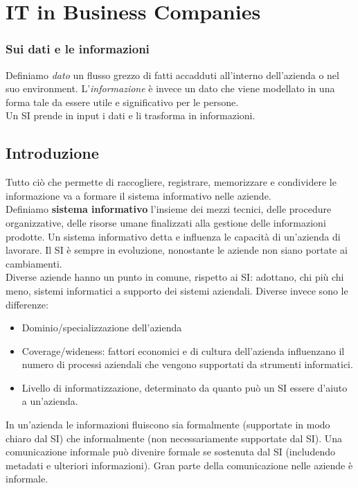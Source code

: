 \chapter{IT in Business Companies}
\subsection{Sui dati e le informazioni}
Definiamo \textit{dato} un flusso grezzo di fatti accadduti all'interno dell'azienda o nel suo environment.
L'\textit{informazione} \`e invece un dato che viene modellato in una forma tale da essere utile e significativo per le persone.\\
Un SI prende in input i dati e li trasforma in informazioni.
\section{Introduzione}

Tutto ci\`o che permette di raccogliere, registrare, memorizzare e condividere le informazione va a formare il sistema informativo nelle aziende.\\
Definiamo \textbf{sistema informativo} l'insieme dei mezzi tecnici, delle procedure organizzative, delle risorse umane finalizzati alla gestione delle informazioni prodotte.
Un sistema informativo detta e influenza le capacit\`a di un'azienda di lavorare. 
Il SI \`e sempre in evoluzione, nonostante le aziende non siano portate ai cambiamenti.\\


Diverse aziende hanno un punto in comune, rispetto ai SI: adottano, chi pi\`u chi meno, sistemi informatici a supporto dei sistemi aziendali.
Diverse invece sono le differenze:
\begin{itemize}
\item Dominio/specializzazione dell'azienda
\item Coverage/wideness: fattori economici e di cultura dell'azienda influenzano il numero di processi aziendali che vengono supportati da strumenti informatici.
\item Livello di informatizzazione, determinato da quanto pu\`o un SI essere d'aiuto a un'azienda.
\end{itemize}

In un'azienda le informazioni fluiscono sia formalmente (supportate in modo chiaro dal SI) che informalmente (non necessariamente supportate dal SI). Una comunicazione informale pu\`o divenire formale se sostenuta dal SI (includendo metadati e ulteriori informazioni). Gran parte della comunicazione nelle aziende \`e informale. 

